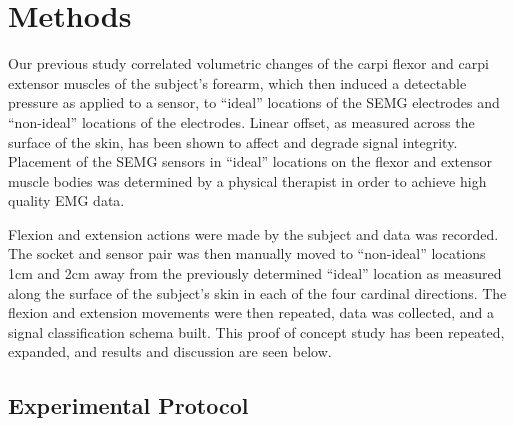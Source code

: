 \documentclass[twocolumn]{sagej}
\begin{document}
\section{Methods}
\label{sec:methods}

Our previous study\cite{SanfordSPIE2015a} correlated volumetric changes of the carpi flexor and carpi extensor muscles of the subject's forearm, which then induced a detectable pressure as applied to a sensor, to ``ideal'' locations of the SEMG electrodes and ``non-ideal'' locations of the electrodes.  Linear offset, as measured across the surface of the skin, has been shown to affect and degrade signal integrity.\cite{Hargrove2006b, AsghariOskoei2007b}  Placement of the SEMG sensors in ``ideal'' locations on the flexor and extensor muscle bodies was determined by a physical therapist in order to achieve high quality EMG data.\par \noindent
Flexion and extension actions were made by the subject and data was recorded.  The socket and sensor pair was then manually moved to ``non-ideal'' locations 1cm and 2cm away from the previously determined ``ideal'' location as measured along the surface of the subject's skin in each of the four cardinal directions.  The flexion and extension movements were then repeated, data was collected, and a signal classification schema built.  This proof of concept study has been repeated, expanded, and results and discussion are seen below.  \par \noindent


\subsection{Experimental Protocol}
\label{sec:protocol}
\end{document}
